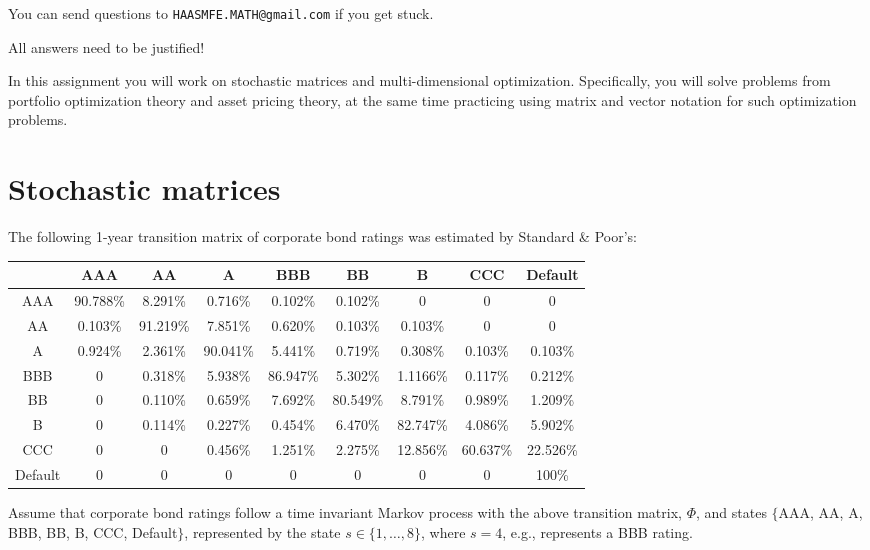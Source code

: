 \documentclass{article}
\begin{document}
\vspace{1em}

\noindent You can send questions to \texttt{HAASMFE.MATH@gmail.com} if you get stuck.

\vspace{1em}

\noindent All answers need to be justified!

\newpage

In this assignment you will work on stochastic matrices and multi-dimensional optimization. Specifically, you will solve problems from portfolio optimization theory and asset pricing theory, at the same time practicing using matrix and vector notation for such optimization problems.

\section{Stochastic matrices}

The following 1-year transition matrix of corporate bond ratings was estimated by Standard \& Poor's:

\begin{center}
\begin{tabular}{|c|cccccccc|}
\hline
& AAA & AA & A & BBB & BB & B & CCC & Default \\
\hline
AAA & 90.788\% & 8.291\% & 0.716\% & 0.102\% & 0.102\% & 0 & 0 & 0 \\
AA & 0.103\% & 91.219\% & 7.851\% & 0.620\% & 0.103\% & 0.103\% & 0 & 0 \\
A & 0.924\% & 2.361\% & 90.041\% & 5.441\% & 0.719\% & 0.308\% & 0.103\% & 0.103\% \\
BBB & 0 & 0.318\% & 5.938\% & 86.947\% & 5.302\% & 1.1166\% & 0.117\% & 0.212\% \\
BB & 0 & 0.110\% & 0.659\% & 7.692\% & 80.549\% & 8.791\% & 0.989\% & 1.209\% \\
B & 0 & 0.114\% & 0.227\% & 0.454\% & 6.470\% & 82.747\% & 4.086\% & 5.902\% \\
CCC & 0 & 0 & 0.456\% & 1.251\% & 2.275\% & 12.856\% & 60.637\% & 22.526\% \\
Default & 0 & 0 & 0 & 0 & 0 & 0 & 0 & 100\% \\
\hline
\end{tabular}
\end{center}

Assume that corporate bond ratings follow a time invariant Markov process with the above transition matrix, $\Phi$, and states $\{$AAA, AA, A, BBB, BB, B, CCC, Default$\}$, represented by the state $s \in \{1, \ldots, 8\}$, where $s = 4$, e.g., represents a BBB rating.
\end{document}
